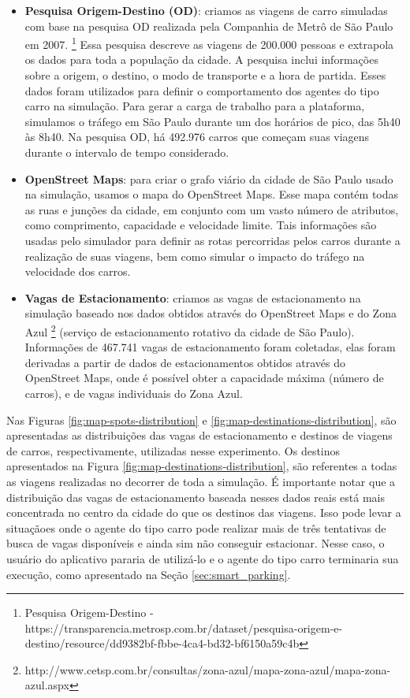 \begin{itemize}
    \item \textbf{Pesquisa Origem-Destino (OD)}: criamos as viagens de carro simuladas com base na pesquisa OD realizada pela Companhia de Metrô de São Paulo em 2007.
        \footnote{Pesquisa Origem-Destino - https://transparencia.metrosp.com.br/dataset/pesquisa-origem-e-destino/resource/dd9382bf-fbbe-4ca4-bd32-bf6150a59c4b}
        Essa pesquisa descreve as viagens de 200.000 pessoas e extrapola os dados para toda a população da cidade.
        A pesquisa inclui informações sobre a origem, o destino, o modo de transporte e a hora de partida.
        Esses dados foram utilizados para definir o comportamento dos agentes do tipo carro na simulação.
        Para gerar a carga de trabalho para a plataforma, simulamos o tráfego em São Paulo durante um dos horários de pico, das 5h40 às 8h40.
        Na pesquisa OD, há 492.976 carros que começam suas viagens durante o intervalo de tempo considerado.

    \item \textbf{OpenStreet Maps}: para criar o grafo viário da cidade de São Paulo usado na simulação, usamos o mapa do OpenStreet Maps.
        Esse mapa contém todas as ruas e junções da cidade, em conjunto com um vasto número de atributos, como comprimento, capacidade e velocidade limite.
        Tais informações são usadas pelo simulador para definir as rotas percorridas pelos carros durante a realização de suas viagens, bem como simular o impacto do tráfego na velocidade dos carros.

    \item \textbf{Vagas de Estacionamento}: criamos as vagas de estacionamento na simulação baseado nos dados obtidos através do OpenStreet Maps e do Zona Azul
        \footnote{http://www.cetsp.com.br/consultas/zona-azul/mapa-zona-azul/mapa-zona-azul.aspx}
        (serviço de estacionamento rotativo da cidade de São Paulo).
        Informações de 467.741 vagas de estacionamento foram coletadas, elas foram derivadas a partir de dados de estacionamentos obtidos através do OpenStreet Maps, onde é possível obter
        a capacidade máxima (número de carros), e de vagas individuais do Zona Azul.
\end{itemize}

Nas Figuras \ref{fig:map-spots-distribution} e \ref{fig:map-destinations-distribution}, são apresentadas as distribuições das vagas de estacionamento e destinos de viagens de carros, respectivamente,
utilizadas nesse experimento.
Os destinos apresentados na Figura \ref{fig:map-destinations-distribution}, são referentes a todas as viagens realizadas no decorrer de toda a simulação.
É importante notar que a distribuição das vagas de estacionamento baseada nesses dados reais está mais concentrada no centro da cidade do que os destinos das viagens.
Isso pode levar a situaçãoes onde o agente do tipo carro pode realizar mais de três tentativas de busca de vagas disponíveis e ainda sim não conseguir estacionar.
Nesse caso, o usuário do aplicativo pararia de utilizá-lo e o agente do tipo carro terminaria sua execução, como apresentado na Seção \ref{sec:smart_parking}.


